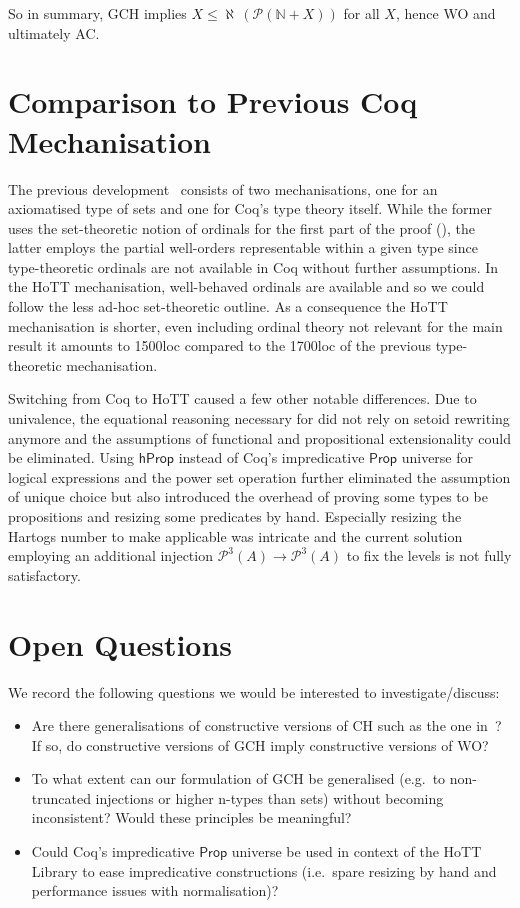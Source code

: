 \documentclass{easychair}
\newcommand{\nat}{\mathbb{N}}
\newcommand{\pow}{\mathcal{P}}
\newcommand{\hprop}{\mathsf{hProp}}
\begin{document}
So in summary, GCH implies $X\le \aleph\,(\pow(\nat + X))$ for all $X$, hence WO and ultimately AC.


\section{Comparison to Previous Coq Mechanisation}

The previous development~\cite{kirst2021generalised} consists of two mechanisations, one for an axiomatised type of sets and one for Coq's type theory itself.
While the former uses the set-theoretic notion of ordinals for the first part of the proof (), the latter employs the partial well-orders representable within a given type since type-theoretic ordinals are not available in Coq without further assumptions.
In the HoTT mechanisation, well-behaved ordinals are available and so we could follow the less ad-hoc set-theoretic outline.
As a consequence the HoTT mechanisation is shorter, even including ordinal theory not relevant for the main result it amounts to 1500loc compared to the 1700loc of the previous type-theoretic mechanisation.

Switching from Coq to HoTT caused a few other notable differences.
Due to univalence, the equational reasoning necessary for  did not rely on setoid rewriting anymore and the assumptions of functional and propositional extensionality could be eliminated.
Using $\hprop$ instead of Coq's impredicative $\mathsf{Prop}$ universe for logical expressions and the power set operation further eliminated the assumption of unique choice but also introduced the overhead of proving some types to be propositions and resizing some predicates by hand.
Especially resizing the Hartogs number to make  applicable was intricate and the current solution employing an additional injection $\pow^3(A)\to\pow^3(A)$ to fix the levels is not fully satisfactory.


\section{Open Questions}

We record the following questions we would be interested to investigate/discuss:
\begin{itemize}[noitemsep]
	\item
	Are there generalisations of constructive versions of CH such as the one in~\cite{gielen1981continuum}?
	If so, do constructive versions of GCH imply constructive versions of WO?
	\item
	To what extent can our formulation of GCH be generalised (e.g.\ to non-truncated injections or higher n-types than sets) without becoming inconsistent? Would these principles be meaningful?
	\item
	Could Coq's impredicative $\mathsf{Prop}$ universe be used in context of the HoTT Library to ease impredicative constructions (i.e.\ spare resizing by hand and performance issues with normalisation)?
\end{itemize}



\scriptsize{}
\vspace{-20em}
\end{document}
